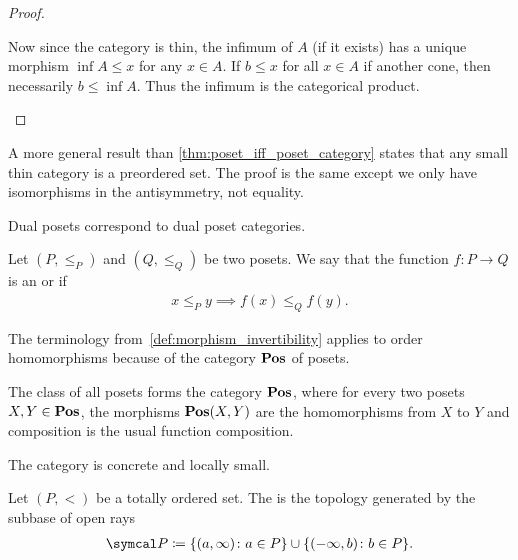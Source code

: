 \begin{proof}
\begin{description}
    Now since the category is thin, the infimum of \( A \) (if it exists) has a unique morphism \( \inf A \leq x \) for any \( x \in A \). If \( b \leq x \) for all \( x \in A \) if another cone, then necessarily \( b \leq \inf A \). Thus the infimum is the categorical product.
  \end{description}
\end{proof}

\begin{note}\label{note:small_thin_category_isomorphic_to_preorder}
  A more general result than \cref{thm:poset_iff_poset_category} states that any small thin category is a preordered set. The proof is the same except we only have isomorphisms in the antisymmetry, not equality.
\end{note}

\begin{proposition}\label{thm:dual_poset_dual_poset_category}
  Dual posets correspond to dual poset categories.
\end{proposition}

\begin{definition}\label{def:order_homomorphism}
  Let \( (P, \leq_P) \) and \( (Q, \leq_Q) \) be two posets. We say that the function \( f: P \to Q \) is an  or  if
  \begin{align*}
    x \leq_P y \implies f(x) \leq_Q f(y).
  \end{align*}

  The terminology from~\cref{def:morphism_invertibility} applies to order homomorphisms because of the category \( \operatorname{\mathbf{Pos}} \) of posets.
\end{definition}

\begin{definition}\label{def:category_of_posets}
  The class of all posets forms the category \( \operatorname{\mathbf{Pos}} \), where for every two posets \( X, Y \in \operatorname{\mathbf{Pos}} \), the morphisms \( \operatorname{\mathbf{Pos}}(X, Y) \) are the homomorphisms from \( X \) to \( Y \) and composition is the usual function composition.

  The category is concrete and locally small.
\end{definition}

\begin{definition}\label{def:order_topology}\cite{nLab:order_topology}
  Let \( (P, <) \) be a totally ordered set. The  is the topology generated by the subbase of open rays
  \begin{align*}
    \Cal{P} \coloneqq \{ (a, \infty) \colon a \in P \} \cup \{ (-\infty, b) \colon b \in P \}.
  \end{align*}
\end{definition}
